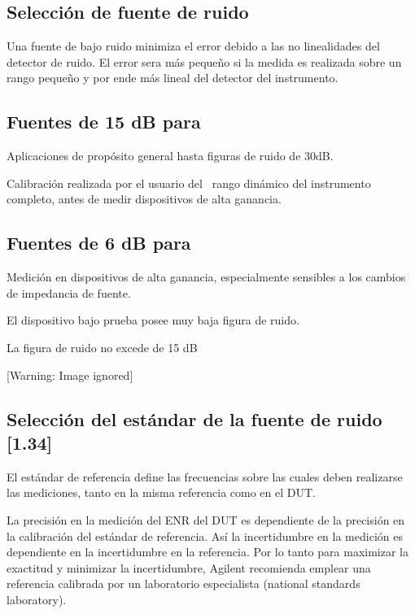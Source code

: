 \documentclass{article}
\begin{document}
\subsection{Selección de fuente de ruido}
Una fuente de bajo ruido minimiza el error debido a las no linealidades del detector de ruido. El error sera más pequeño si la medida es realizada sobre un rango pequeño y por ende más lineal del detector del instrumento. 

\subsection{Fuentes de 15 dB para}
Aplicaciones de propósito general hasta figuras de ruido de 30dB.

Calibración realizada por el usuario del \ rango dinámico del instrumento completo, antes de medir dispositivos de alta ganancia.

\subsection{Fuentes de 6 dB para}
Medición en dispositivos de alta ganancia, especialmente sensibles a los cambios de impedancia de fuente.

El dispositivo bajo prueba posee muy baja figura de ruido.

La figura de ruido no excede de 15 dB



\begin{center}
 [Warning: Image ignored] %

\end{center}
\subsection[Selección del estándar de la fuente de ruido [1.34{]}]{Selección del estándar de la fuente de ruido [1.34]}
El estándar de referencia define las frecuencias sobre las cuales deben realizarse las mediciones, tanto en la misma referencia como en el DUT. 

La precisión en la medición del ENR del DUT es dependiente de la precisión en la calibración del estándar de referencia. Así la incertidumbre en la medición es dependiente en la incertidumbre en la referencia. Por lo tanto para maximizar la exactitud y minimizar la incertidumbre, Agilent recomienda emplear una referencia calibrada por un laboratorio especialista (national standards laboratory).
\end{document}

